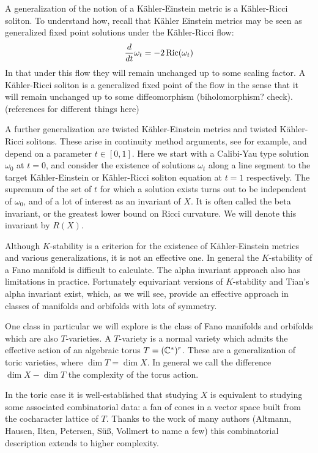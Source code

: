 A generalization of the notion of a K\"ahler-Einstein metric is a K\"ahler-Ricci soliton. To understand how, recall that K\"ahler Einstein metrics may be seen as generalized fixed point solutions under the K\"ahler-Ricci flow:
\[
\frac{d}{dt} \omega_t = -2 \mathop{\rm Ric}\nolimits(\omega_t)
\]
In that under this flow they will remain unchanged up to some scaling factor. A K\"ahler-Ricci soliton is a generalized fixed point of the flow in the sense that it will remain unchanged up to some diffeomorphism (biholomorphism? check). (references for different things here)

A further generalization are twisted K\"ahler-Einstein metrics and twisted K\"ahler-Ricci solitons. These arise in continuity method arguments, see \cite{datar2016kahler} for example, and depend on a parameter \(t \in [0,1]\). Here we start with a Calibi-Yau type solution \(\omega_0\) at \(t=0\), and consider the existence of solutions \(\omega_t\) along a line segment to the target K\"ahler-Einstein or K\"ahler-Ricci soliton equation at \(t= 1\) respectively. The supremum of the set of \(t\) for which a solution exists turns out to be independent of \(\omega_0\), and of a lot of interest as an invariant of \(X\). It is often called the beta invariant, or the greatest lower bound on Ricci curvature. We will denote this invariant by \(R(X)\).

Although \(K\)-stability is a criterion for the existence of K\"ahler-Einstein metrics and various generalizations, it is not an effective one. In general the \(K\)-stability of a Fano manifold is difficult to calculate. The alpha invariant approach also has limitations in practice. Fortunately equivariant versions of \(K\)-stability and Tian's alpha invariant exist, which, as we will see, provide an effective approach in classes of manifolds and orbifolds with lots of symmetry.

One class in particular we will explore is the class of Fano manifolds and orbifolds which are also \(T\)-varieties. A \(T\)-variety is a normal variety which admits the effective action of an algebraic torus \(T = (\mathbb{C}^*)^r\). These are a generalization of toric varieties, where \(\dim T = \dim X\). In general we call the difference \(\dim X - \dim T\) the complexity of the torus action.

In the toric case it is well-established that studying \(X\) is equivalent to studying some associated combinatorial data: a fan of cones in a vector space built from the cocharacter lattice of \(T\). Thanks to the work of many authors (Altmann, Hausen, Ilten, Petersen, S\"u\ss, Vollmert to name a few) this combinatorial description extends to higher complexity.

